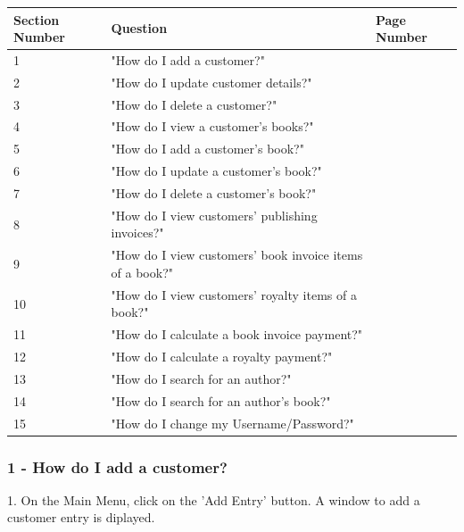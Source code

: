 \begin{center}
\begin{tabular}{|p{3cm}|p{3cm}|p{3cm}|}
        \hline
        \textbf{Section Number} & \textbf{Question} & \textbf{Page Number} \\ \hline
        1 & "How do I add a customer?" & \\ \hline
        2 & "How do I update customer details?" & \\ \hline
        3 & "How do I delete a customer?" & \\ \hline
        4 & "How do I view a customer's books?" & \\ \hline
        5 & "How do I add a customer's book?" & \\ \hline
        6 & "How do I update a customer's book?" & \\ \hline
        7 & "How do I delete a customer's book?" & \\ \hline
        8 & "How do I view customers' publishing invoices?" & \\ \hline
        9 & "How do I view customers' book invoice items of a book?" & \\ \hline
        10 & "How do I view customers' royalty items of a book?" & \\ \hline
        11 & "How do I calculate a book invoice payment?" & \\ \hline
        12 & "How do I calculate a royalty payment?" & \\ \hline
        13 & "How do I search for an author?" & \\ \hline
        14 & "How do I search for an author's book?"  \\ \hline
        15 & "How do I change my Username/Password?" & \\ \hline
\end{tabular}
\end{center}

\subsubsection{1 - How do I add a customer?}

1. On the Main Menu, click on the 'Add Entry' button. A window to add a customer entry is diplayed.

